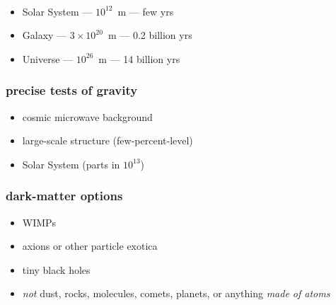 \documentclass{beamer}
\begin{document}
{\begin{frame}[plain]~\end{frame}}

\begin{frame}
\begin{itemize}
\item Solar System --- $10^{12}$~m --- few yrs
\item Galaxy --- $3\times 10^{20}$~m --- 0.2 billion yrs
\item Universe --- $10^{26}$~m --- 14 billion yrs
\end{itemize}
\end{frame}

\begin{frame}
\frametitle{precise tests of gravity}
\begin{itemize}
\item cosmic microwave background
\item large-scale structure (few-percent-level)
\item Solar System (parts in $10^13$)
\end{itemize}
\end{frame}

\begin{frame}
\frametitle{dark-matter options}
\begin{itemize}
\item WIMPs
\item axions or other particle exotica
\item tiny black holes
\item \emph{not} dust, rocks, molecules, comets, planets, or anything \emph{made of atoms}
\end{itemize}
\end{frame}

{\begin{frame}[plain]~\end{frame}}

{\begin{frame}[plain]~\end{frame}}
\end{document}
